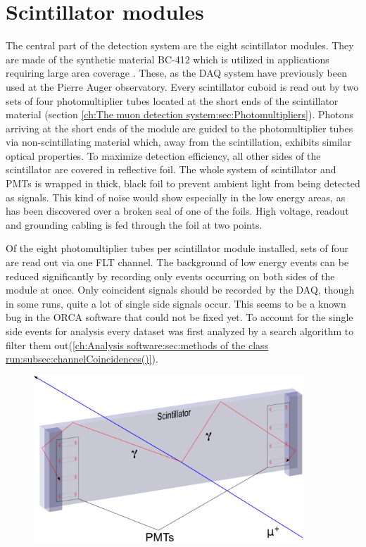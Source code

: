   \section{Scintillator modules}
  \label{ch:The muon detection system:sec:Scintillator modules}
  The central part of the detection system are the eight scintillator modules. They are made of the synthetic material BC-412 which is utilized in applications requiring large area coverage \cite{scintillatorManual}. These, as the DAQ system have previously been used at the Pierre Auger observatory. Every scintillator cuboid is read out by two sets of four photomultiplier tubes located at the short ends of the scintillator material (section \ref{ch:The muon detection system:sec:Photomultipliers}). Photons arriving at the short ends of the module are guided to the photomultiplier tubes via non-scintillating material which, away from the scintillation, exhibits similar optical properties. To maximize detection efficiency, all other sides of the scintillator are covered in reflective foil. The whole system of scintillator and PMTs is wrapped in thick, black foil to prevent ambient light from being detected as signals. This kind of noise would show especially in the low energy areas, as has been discovered over a broken seal of one of the foils. High voltage, readout and grounding cabling is fed through the foil at two points.

  Of the eight photomultiplier tubes per scintillator module installed, sets of four are read out via one FLT channel. The background of low energy events can be reduced significantly by recording only events occurring on both sides of the module at once. Only coincident signals should be recorded by the DAQ, though in some runs, quite a lot of single side signals occur. This seems to be a known bug in the ORCA software that could not be fixed yet. To account for the single side events for analysis every dataset was first analyzed by a search algorithm to filter them out(\ref{ch:Analysis software:sec:methods of the class run:subsec:channelCoincidences()}).
  

    \begin{figure}
    \centering
    \includegraphics[width = 0.9\textwidth]{graphics/muonModules/moduleDrawing.png}	
  \end{figure}
  
